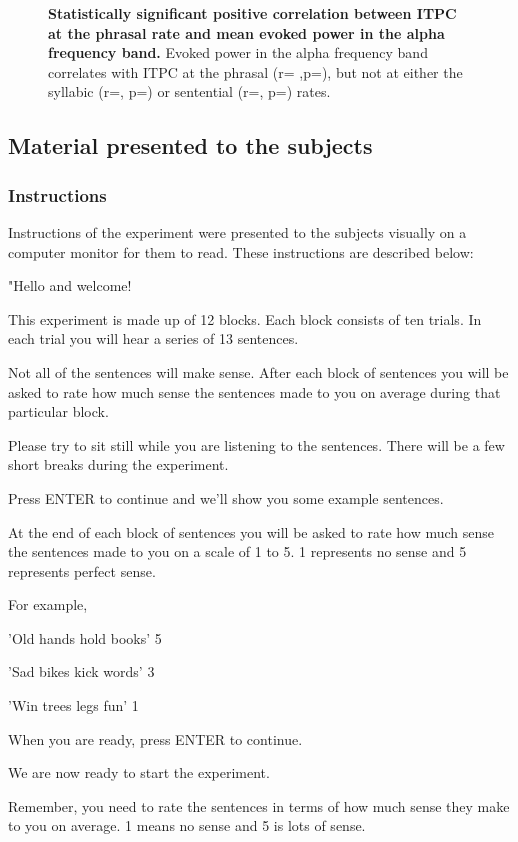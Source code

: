 \documentclass[10pt,letterpaper]{article}
\begin{document}
\begin{figure}[tbhp]
\caption{\textbf{Statistically significant positive correlation between ITPC at the phrasal rate and mean evoked power in the alpha frequency band.} Evoked power in the alpha frequency band correlates with ITPC at the phrasal (r= ,p=), but not at either the syllabic (r=, p=) or sentential (r=, p=) rates.}
\label{Fig4}
\end{figure}


\subsection{Material presented to the subjects}

\subsubsection{Instructions}

Instructions of the experiment were presented to the subjects visually on a computer monitor for them to read. These instructions are described below:

"Hello and welcome!

This experiment is made up of 12 blocks.
Each block consists of ten trials.
In each trial you will hear a series of 13 sentences.

Not all of the sentences will make sense.
After each block of sentences you will be asked to rate how much sense
the sentences made to you on average during that particular block.

Please try to sit still while you are listening to the sentences.
There will be a few short breaks during the experiment.

Press ENTER to continue and we'll show you some example sentences.

At the end of each block of sentences you will be asked to rate how much
sense the sentences made to you on a scale of 1 to 5.
1 represents no sense and 5 represents perfect sense.

For example,

'Old hands hold books'    5 

'Sad bikes kick words'    3   

'Win trees legs fun'      1

When you are ready, press ENTER to continue.

We are now ready to start the experiment.

Remember, you need to rate the sentences in terms of
how much sense they make to you on average.
1 means no sense and 5 is lots of sense.
\end{document}
